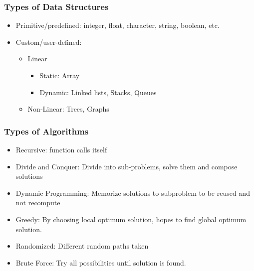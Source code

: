\begin{frame}
	\frametitle{Types of Data Structures}
		\begin{itemize}
			\item Primitive/predefined: integer, float, character, string, boolean, etc.
			\item Custom/user-defined: 
					\begin{itemize}
					\item Linear
					\begin{itemize}
						\item Static: Array
						\item Dynamic: Linked lists, Stacks, Queues
					\end{itemize}					
					\item Non-Linear: Trees, Graphs
				\end{itemize}
		\end{itemize}
\end{frame}

\begin{frame}
	\frametitle{Types of Algorithms}
		\begin{itemize}
			\item Recursive: function calls itself
			\item Divide and Conquer: Divide into sub-problems, solve them and compose solutions
			\item Dynamic Programming: Memorize solutions to subproblem to be reused and not recompute
			\item Greedy: By choosing local optimum solution, hopes to find global optimum solution.
			\item Randomized: Different random paths taken
			\item Brute Force: Try all possibilities until solution is found.
		\end{itemize}
\end{frame}